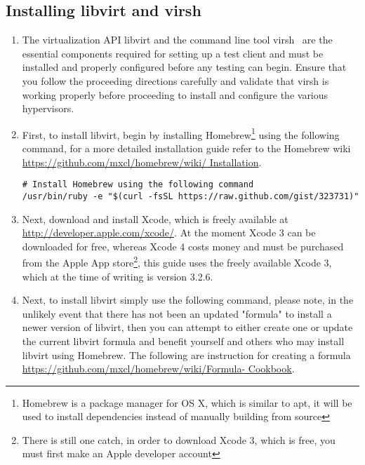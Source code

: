 \subsection{Installing libvirt and virsh}
\label{sec:osxvirsh}
\begin{enumerate}
\item	The virtualization API libvirt and the command line tool virsh~\cite{libvirt} are the essential components required 
		for setting up a test client and must be installed and properly configured before any testing can begin. Ensure that
		you follow the proceeding directions carefully and validate that virsh is working properly before proceeding to 
		install and configure the various hypervisors.

\item	First, to install libvirt, begin by installing Homebrew\footnote{Homebrew is a package manager for OS X, which is similar to apt, it will
                be used to install dependencies instead of manually building from source} using the following command, for a more detailed
                installation guide refer to the Homebrew wiki  \url{https://github.com/mxcl/homebrew/wiki/ Installation}.

\lstset{language=bash, caption=Install Homebrew}
\begin{lstlisting}
# Install Homebrew using the following command
/usr/bin/ruby -e "$(curl -fsSL https://raw.github.com/gist/323731)"
\end{lstlisting}

\item        Next, download and install Xcode, which is freely available at \url{http://developer.apple.com/xcode/}. At the moment Xcode 3 can
                be downloaded for free, whereas Xcode 4 costs money and must be purchased from the Apple App store\footnote{There is still one
                catch, in order to download Xcode 3, which is free, you must first make an Apple developer account}, this guide uses the freely
                available Xcode 3, which at the time of writing is version 3.2.6.

\item        Next, to install libvirt simply use the following command, please note, in the unlikely event that there has not been an updated
                "formula" to install a newer version of libvirt, then you can attempt to either create one or update the current libvirt formula and 
                benefit yourself and others who may install libvirt using Homebrew.  The following are instruction for creating a formula 
                \url{https://github.com/mxcl/homebrew/wiki/Formula- Cookbook}.
                

\end{enumerate}

